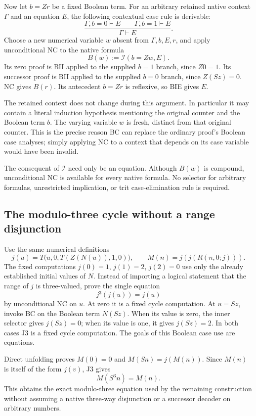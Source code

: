 Now let $b=Zr$ be a fixed Boolean term.  For an arbitrary retained native
context $\Gamma$ and an equation $E$, the following contextual case rule
is derivable:
\[
 \frac{\Gamma,b=0\vdash E\qquad\Gamma,b=1\vdash E}
      {\Gamma\vdash E}.
 \tag{BC}\label{eq:native-sr-boolean-cases}
\]
Choose a new numerical variable $w$ absent from $\Gamma,b,E,r$, and
apply unconditional NC to the native formula
\[
                       B(w):=\mathcal I(b=Zw,E).
\]
Its zero proof is BII applied to the supplied $b=1$ branch, since
$Z0=1$.  Its successor proof is BII applied to the supplied $b=0$
branch, since $Z(Sz)=0$.  NC gives $B(r)$.  Its antecedent $b=Zr$
is reflexive, so BIE gives $E$.

The retained context does not change during this argument.  In
particular it may contain a literal induction hypothesis mentioning
the original counter and the Boolean term $b$.  The varying variable
$w$ is fresh, distinct from that original counter.  This is the precise
reason BC can replace the ordinary proof's Boolean case analyses;
simply applying NC to a context that depends on its case variable
would have been invalid.

The consequent of $\mathcal I$ need only be an equation.  Although
$B(w)$ is compound, unconditional NC is available for every native
formula.  No selector for arbitrary formulas, unrestricted implication,
or trit case-elimination rule is required.

\subsection{The modulo-three cycle without a range disjunction}

Use the same numerical definitions
\[
 j(u)=T\bigl(u,0,T(Z(N(u)),1,0)\bigr),\qquad
 M(n)=j(j(R(n,0;j))).
\]
The fixed computations $j(0)=1$, $j(1)=2$, $j(2)=0$ use only the
already established initial values of $N$.
Instead of importing a logical statement that the range of $j$ is
three-valued, prove the single equation
\[
                              j^3(j(u))=j(u)
 \tag{J3}\label{eq:native-sr-j3}
\]
by unconditional NC on $u$.  At zero it is a fixed cycle computation.
At $u=Sz$, invoke BC on the Boolean term $N(Sz)$.  When its value is
zero, the inner selector gives $j(Sz)=0$; when its value is one, it
gives $j(Sz)=2$.  In both cases J3 is a fixed cycle computation.
The goals of this Boolean case use are equations.

Direct unfolding proves $M(0)=0$ and $M(Sn)=j(M(n))$.
Since $M(n)$ is itself of the form $j(v)$, J3 gives
\[
                              M(S^3n)=M(n).
\]
This obtains the exact modulo-three equation used by the remaining
construction without assuming a native three-way disjunction or a
successor decoder on arbitrary numbers.

